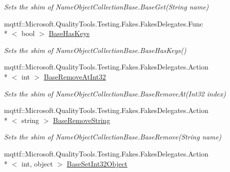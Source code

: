 \begin{DoxyCompactItemize}
\begin{DoxyCompactList}\small\item\em Sets the shim of Name\-Object\-Collection\-Base.\-Base\-Get(\-String name)\end{DoxyCompactList}\item 
mqttf\-::\-Microsoft.\-Quality\-Tools.\-Testing.\-Fakes.\-Fakes\-Delegates.\-Func\\*
$<$ bool $>$ \hyperlink{class_system_1_1_collections_1_1_specialized_1_1_fakes_1_1_shim_name_object_collection_base_ab429ce884fffa7c3e6d25d91f1a049c0}{Base\-Has\-Keys}
\begin{DoxyCompactList}\small\item\em Sets the shim of Name\-Object\-Collection\-Base.\-Base\-Has\-Keys()\end{DoxyCompactList}\item 
mqttf\-::\-Microsoft.\-Quality\-Tools.\-Testing.\-Fakes.\-Fakes\-Delegates.\-Action\\*
$<$ int $>$ \hyperlink{class_system_1_1_collections_1_1_specialized_1_1_fakes_1_1_shim_name_object_collection_base_a9b78b1318edf930e3b4d7e343fd6f65a}{Base\-Remove\-At\-Int32}
\begin{DoxyCompactList}\small\item\em Sets the shim of Name\-Object\-Collection\-Base.\-Base\-Remove\-At(\-Int32 index)\end{DoxyCompactList}\item 
mqttf\-::\-Microsoft.\-Quality\-Tools.\-Testing.\-Fakes.\-Fakes\-Delegates.\-Action\\*
$<$ string $>$ \hyperlink{class_system_1_1_collections_1_1_specialized_1_1_fakes_1_1_shim_name_object_collection_base_afc1cbd268095c71b76cbcf1b83258144}{Base\-Remove\-String}
\begin{DoxyCompactList}\small\item\em Sets the shim of Name\-Object\-Collection\-Base.\-Base\-Remove(\-String name)\end{DoxyCompactList}\item 
mqttf\-::\-Microsoft.\-Quality\-Tools.\-Testing.\-Fakes.\-Fakes\-Delegates.\-Action\\*
$<$ int, object $>$ \hyperlink{class_system_1_1_collections_1_1_specialized_1_1_fakes_1_1_shim_name_object_collection_base_a3449833dd39cf7db2602791c261e7951}{Base\-Set\-Int32\-Object}

\end{DoxyCompactItemize}
